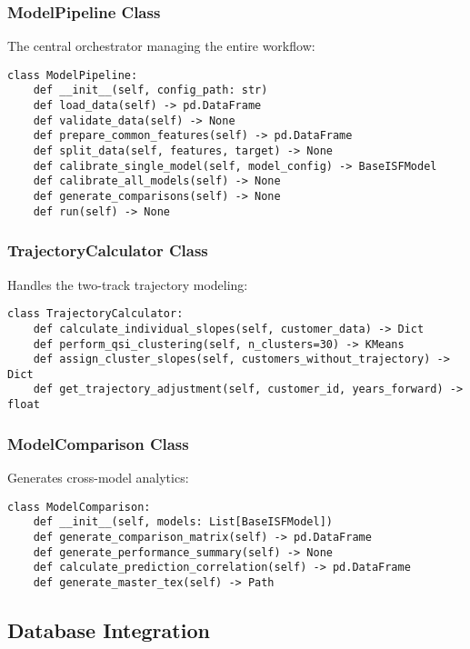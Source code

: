 \subsubsection{ModelPipeline Class}

The central orchestrator managing the entire workflow:

\begin{verbatim}
class ModelPipeline:
    def __init__(self, config_path: str)
    def load_data(self) -> pd.DataFrame
    def validate_data(self) -> None
    def prepare_common_features(self) -> pd.DataFrame
    def split_data(self, features, target) -> None
    def calibrate_single_model(self, model_config) -> BaseISFModel
    def calibrate_all_models(self) -> None
    def generate_comparisons(self) -> None
    def run(self) -> None
\end{verbatim}

\subsubsection{TrajectoryCalculator Class}

Handles the two-track trajectory modeling:

\begin{verbatim}
class TrajectoryCalculator:
    def calculate_individual_slopes(self, customer_data) -> Dict
    def perform_qsi_clustering(self, n_clusters=30) -> KMeans
    def assign_cluster_slopes(self, customers_without_trajectory) -> Dict
    def get_trajectory_adjustment(self, customer_id, years_forward) -> float
\end{verbatim}

\subsubsection{ModelComparison Class}

Generates cross-model analytics:

\begin{verbatim}
class ModelComparison:
    def __init__(self, models: List[BaseISFModel])
    def generate_comparison_matrix(self) -> pd.DataFrame
    def generate_performance_summary(self) -> None
    def calculate_prediction_correlation(self) -> pd.DataFrame
    def generate_master_tex(self) -> Path
\end{verbatim}

\subsection{Database Integration}

